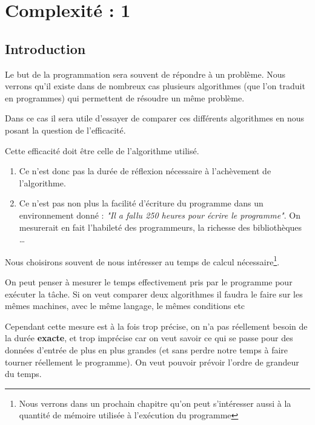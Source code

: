 \section{Complexité : 1}
\subsection{Introduction}
Le but de la programmation sera souvent de répondre à un problème.
Nous verrons qu'il existe dans de nombreux cas plusieurs algorithmes (que l'on traduit en programmes) qui permettent de résoudre un même problème.

Dans ce cas il sera utile d'essayer de comparer ces différents algorithmes en nous posant la question de l'efficacité. 

Cette efficacité doit être celle de l'algorithme utilisé.

\begin{enumerate}

\item Ce n'est donc pas la durée de réflexion nécessaire à l'achèvement de l'algorithme.

\item Ce n'est pas non plus la facilité d'écriture du programme dans un environnement donné : {\it "Il a fallu 250 heures pour écrire le programme"}. On mesurerait en fait l'habileté des programmeurs, la richesse des bibliothèques \dots
 
\end{enumerate}

Nous choisirons souvent de nous intéresser au temps de calcul nécessaire\footnote{Nous verrons dans un prochain chapitre qu'on peut s'intéresser aussi à la quantité de mémoire utilisée à l'exécution du programme}. 

On peut penser à mesurer le temps effectivement pris par le programme pour exécuter la tâche. Si on veut comparer deux algorithmes il faudra le faire sur les mêmes machines, avec le même langage, le mêmes conditions etc

Cependant cette mesure est à la fois trop précise, on n'a pas réellement besoin de la durée {\bf exacte}, et trop imprécise car on veut savoir ce qui se passe pour des données d'entrée de plus en plus grandes (et sans perdre notre temps à faire tourner réellement le programme). On veut pouvoir prévoir l'ordre de grandeur du temps.

